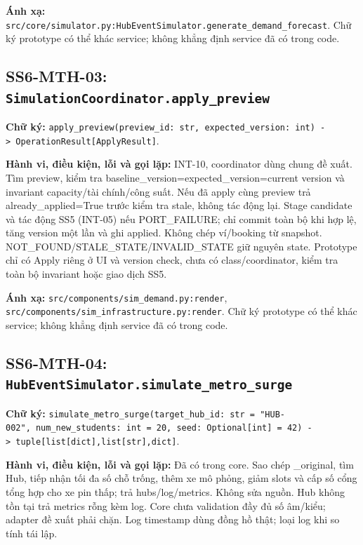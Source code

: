 \documentclass[11pt,a4paper]{article}
\begin{document}
\textbf{Ánh xạ:}
\texttt{src/core/simulator.py:HubEventSimulator.generate\_demand\_forecast}.
Chữ ký prototype có thể khác service; không khẳng định service đã có
trong code.

\hypertarget{ss6-mth-03-simulationcoordinator.apply_preview}{%
\subsection{\texorpdfstring{SS6-MTH-03:
\texttt{SimulationCoordinator.apply\_preview}}{SS6-MTH-03: SimulationCoordinator.apply\_preview}}\label{ss6-mth-03-simulationcoordinator.apply_preview}}

\textbf{Chữ ký:}
\texttt{apply\_preview(preview\_id:\ str,\ expected\_version:\ int)\ -\textgreater{}\ OperationResult{[}ApplyResult{]}}.

\textbf{Hành vi, điều kiện, lỗi và gọi lặp:} INT-10, coordinator dùng
chung đề xuất. Tìm preview, kiểm tra
baseline\_version=expected\_version=current version và invariant
capacity/tài chính/công suất. Nếu đã apply cùng preview trả
already\_applied=True trước kiểm tra stale, không tác động lại. Stage
candidate và tác động SS5 (INT-05) nếu PORT\_FAILURE; chỉ commit toàn bộ
khi hợp lệ, tăng version một lần và ghi applied. Không chép ví/booking
từ snapshot. NOT\_FOUND/STALE\_STATE/INVALID\_STATE giữ nguyên state.
Prototype chỉ có Apply riêng ở UI và version check, chưa có
class/coordinator, kiểm tra toàn bộ invariant hoặc giao dịch SS5.

\textbf{Ánh xạ:} \texttt{src/components/sim\_demand.py:render},
\texttt{src/components/sim\_infrastructure.py:render}. Chữ ký prototype
có thể khác service; không khẳng định service đã có trong code.

\hypertarget{ss6-mth-04-hubeventsimulator.simulate_metro_surge}{%
\subsection{\texorpdfstring{SS6-MTH-04:
\texttt{HubEventSimulator.simulate\_metro\_surge}}{SS6-MTH-04: HubEventSimulator.simulate\_metro\_surge}}\label{ss6-mth-04-hubeventsimulator.simulate_metro_surge}}

\textbf{Chữ ký:}
\texttt{simulate\_metro\_surge(target\_hub\_id:\ str\ =\ "HUB-002",\ num\_new\_students:\ int\ =\ 20,\ seed:\ Optional{[}int{]}\ =\ 42)\ -\textgreater{}\ tuple{[}list{[}dict{]},list{[}str{]},dict{]}}.

\textbf{Hành vi, điều kiện, lỗi và gọi lặp:} Đã có trong core. Sao chép
\_original, tìm Hub, tiếp nhận tối đa số chỗ trống, thêm xe mô phỏng,
giảm slots và cấp số cổng tổng hợp cho xe pin thấp; trả
hubs/log/metrics. Không sửa nguồn. Hub không tồn tại trả metrics rỗng
kèm log. Core chưa validation đầy đủ số âm/kiểu; adapter đề xuất phải
chặn. Log timestamp dùng đồng hồ thật; loại log khi so tính tái lập.
\end{document}
